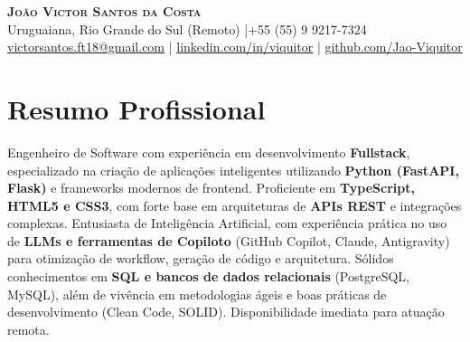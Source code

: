 \documentclass[letterpaper,11pt]{article}
\begin{document}
\begin{center}
\textbf{\huge \scshape João Victor Santos da Costa} \\[4pt]
\small
Uruguaiana, Rio Grande do Sul (Remoto) \quad|\quad +55 (55) 9 9217-7324 \\[2pt]
\href{mailto:victorsantos.ft18@gmail.com}{victorsantos.ft18@gmail.com} \quad|\quad
\href{https://linkedin.com/in/viquitor}{linkedin.com/in/viquitor} \quad|\quad
\href{https://github.com/Jao-Viquitor}{github.com/Jao-Viquitor}
\end{center}

\section{Resumo Profissional}
Engenheiro de Software com experiência em desenvolvimento \textbf{Fullstack}, especializado na criação de aplicações inteligentes utilizando \textbf{Python (FastAPI, Flask)} e frameworks modernos de frontend. Proficiente em \textbf{TypeScript, HTML5 e CSS3}, com forte base em arquiteturas de \textbf{APIs REST} e integrações complexas.
Entusiasta de Inteligência Artificial, com experiência prática no uso de \textbf{LLMs e ferramentas de Copiloto} (GitHub Copilot, Claude, Antigravity) para otimização de workflow, geração de código e arquitetura.
Sólidos conhecimentos em \textbf{SQL e bancos de dados relacionais} (PostgreSQL, MySQL), além de vivência em metodologias ágeis e boas práticas de desenvolvimento (Clean Code, SOLID). Disponibilidade imediata para atuação remota.

\end{document}
